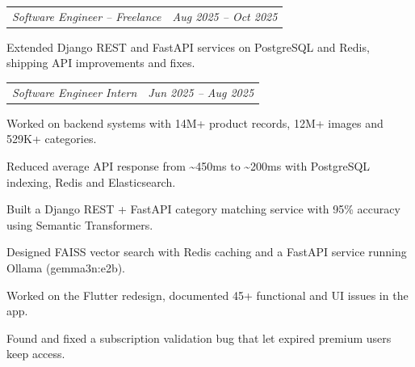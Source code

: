 \documentclass[10pt,a4paper]{extarticle}
\makeatletter
\newcommand{\ca}{\textasciitilde}
\newcommand{\subentry}[2]{%
\noindent\begin{tabular*}{\textwidth}{@{\extracolsep{\fill}}lr}
\textit{\color{muted}#1} & \textit{\color{muted}#2}\\
\end{tabular*}\vspace{2pt}
}
\makeatother
\begin{document}
\vspace{1pt}
\subentry{Software Engineer -- Freelance}{Aug 2025 -- Oct 2025}
\begin{bullets}
\item Extended Django REST and FastAPI services on PostgreSQL and Redis, shipping API improvements and fixes.
\end{bullets}

\vspace{1pt}
\subentry{Software Engineer Intern}{Jun 2025 -- Aug 2025}
\begin{bullets}
\item Worked on backend systems with 14M+ product records, 12M+ images and 529K+ categories.
\item Reduced average API response from \ca{}450ms to \ca{}200ms with PostgreSQL indexing, Redis and Elasticsearch.
\item Built a Django REST + FastAPI category matching service with 95\% accuracy using Semantic Transformers.
\item Designed FAISS vector search with Redis caching and a FastAPI service running Ollama (gemma3n:e2b).
\item Worked on the Flutter redesign, documented 45+ functional and UI issues in the app.
\item Found and fixed a subscription validation bug that let expired premium users keep access.
\end{bullets}

\end{document}
